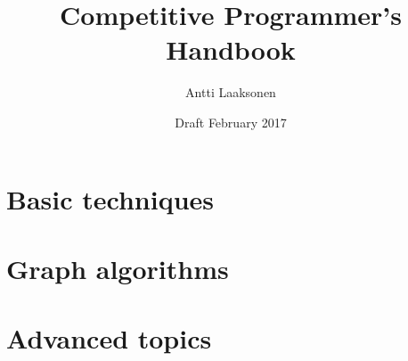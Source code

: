 \documentclass[twoside,12pt,a4paper,english]{book}
\date{Draft February 2017}
\title{\Huge Competitive Programmer's Handbook}
\author{\Large Antti Laaksonen}
\begin{document}


\frontmatter
\maketitle
\setcounter{tocdepth}{1}
\tableofcontents



\mainmatter
{}
\setcounter{page}{1}

\newcommand{\key}[1] {\textbf{#1}}

\part{Basic techniques}










\part{Graph algorithms}










\part{Advanced topics}












\cleardoublepage
\printindex
\end{document}

